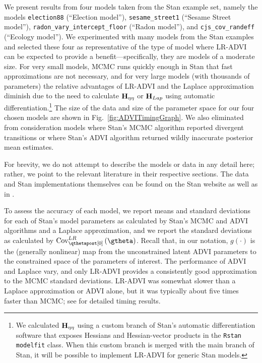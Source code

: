 \documentclass{article}\usepackage[]{graphicx}\usepackage[]{color}
\theoremstyle{definition}
\theoremstyle{plain}
\theoremstyle{plain}
\theoremstyle{plain}
\theoremstyle{definition}
\theoremstyle{plain}
\theoremstyle{plain}
\newcommand{\fig}[1]{Fig.~\ref{fig:#1}}
\begin{document}
We present results from four models taken from the Stan example set, namely the models
\texttt{election88} (``Election model''), \texttt{sesame\_street1} (``Sesame
Street model''), \texttt{radon\_vary\_intercept\_floor}
(``Radon model''), and
\texttt{cjs\_cov\_randeff} (``Ecology model''). We experimented with many models
from the Stan examples and selected these four as representative of the type
of model where LR-ADVI can be expected to provide a benefit---specifically,
they are models of a moderate size. For very small models, MCMC
runs quickly enough in Stan that fast approximations are not necessary, and for
very large models (with thousands of parameters) the relative advantages of
LR-ADVI and the Laplace approximation diminish due to the need to calculate
$\mathbf{H}_{\eta\eta}$ or $\mathbf{H}_{Lap}$ using automatic differentiation.\footnote{We calculated
$\mathbf{H}_{\eta\eta}$ using a custom branch of Stan's automatic differentiation software
\citep{carpenter:2015:stan} that exposes Hessians and Hessian-vector products in
the \texttt{Rstan} \texttt{modelfit} class. When this custom branch is merged
with the main branch of Stan, it will be possible to implement LR-ADVI for
generic Stan models.} The size of the data and size of the parameter space for our four
chosen models are shown in \fig{ADVITimingGraph}. We also eliminated from
consideration models where Stan's MCMC algorithm reported divergent transitions
or where Stan's ADVI algorithm returned wildly inaccurate posterior mean
estimates.

For brevity, we do not attempt to describe the models or data in any
detail here; rather, we point to the relevant literature in their
respective sections. The data and Stan implementations themselves
can be found on the Stan website \citep{stan-examples:2017} as well as in
.

To assess the accuracy of each model, we report means and standard deviations
for each of Stan's model parameters as calculated by Stan's MCMC and ADVI
algorithms and a Laplace approximation, and we report the standard deviations as
calculated by $\lrvbcov\left(\gtheta\right)$. Recall that, in our notation,
$g\left(\cdot\right)$ is the (generally nonlinear) map from the unconstrained
latent ADVI parameters to the constrained space of the parameters of interest.
The performance of ADVI and Laplace vary, and only LR-ADVI provides a
consistently good approximation to the MCMC standard deviations. LR-ADVI was
somewhat slower than a Laplace approximation or ADVI alone, but it was typically
about five times faster than MCMC; see  for
detailed timing results.
\end{document}
